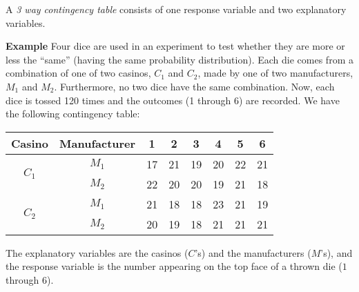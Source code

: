 \documentclass[12pt]{article}
\newlength\LL \settowidth\LL{100}
\begin{document}
A \emph{3 way contingency table} consists of one response variable and two explanatory variables.  
\par
\textbf{Example}
Four dice are used in an experiment to test whether they are more or less the ``same'' (having the same probability distribution).  Each die comes from a combination of one of two casinos, $C_1$ and $C_2$, made by one of two manufacturers, $M_1$ and $M_2$.  Furthermore, no two dice have the same combination.  Now, each dice is tossed 120 times and the outcomes (1 through 6) are recorded.  We have the following contingency table:
\begin{center}
\begin{tabular}{|c|c|c|c|c|c|c|c|}
\hline
Casino & Manufacturer & 1 & 2 & 3 & 4 & 5 & 6 \\
\hline
\multirow{2}{\LL}{$C_1$}
& $M_1$ & 17 & 21 & 19 & 20 & 22 & 21 \\ 
\cline{2-8}
 & $M_2$ & 22 & 20 & 20 & 19 & 21 & 18 \\
\hline
\multirow{2}{\LL}{$C_2$}
& $M_1$ & 21 & 18 & 18 & 23 & 21 & 19 \\ 
\cline{2-8}
 & $M_2$ & 20 & 19 & 18 & 21 & 21 & 21 \\
\hline
\end{tabular}
\end{center}
The explanatory variables are the casinos ($C$'s) and the manufacturers ($M$'s), and the response variable is the number appearing on the top face of a thrown die ($1$ through $6$).
\end{document}
